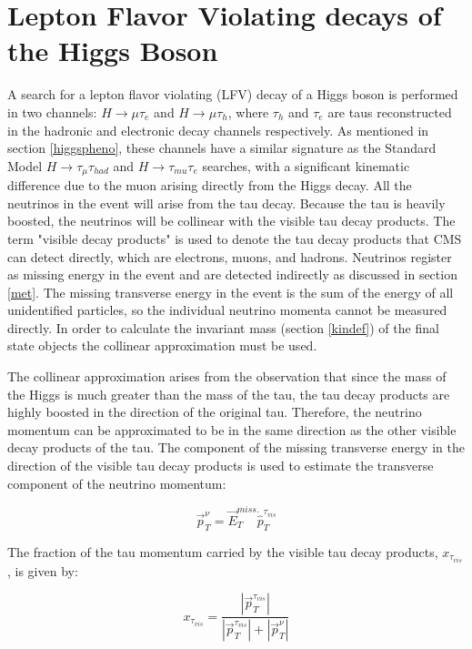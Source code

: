 \documentclass[oneside, letterpaper, oldfontcommands]{memoir}
\begin{document}
\chapter{Lepton Flavor Violating decays of the Higgs Boson}\label{lfv}
\qquad A search for a lepton flavor violating (LFV) decay of a Higgs boson is performed in two channels: $H \rightarrow \mu\tau_{e}$ and $H \rightarrow \mu\tau_{h}$, where $\tau_{h}$ and $\tau_{e}$ are taus reconstructed in the hadronic and electronic decay channels respectively. As mentioned in section \ref{higgspheno}, these channels have a similar signature as the Standard Model $H \rightarrow \tau_{\mu} \tau_{had}$ and $H \rightarrow \tau_{mu}\tau_{e}$ searches, with a significant kinematic difference due to the muon arising directly from the Higgs decay. All the neutrinos in the event will arise from the tau decay. Because the tau is heavily boosted, the neutrinos will be collinear with the visible tau decay products. The term "visible decay products" is used to denote the tau decay products that CMS can detect directly, which are electrons, muons, and hadrons. Neutrinos register as missing energy in the event and are detected indirectly as discussed in section \ref{met}. The missing transverse energy in the event is the sum of the energy of all unidentified particles, so the individual neutrino momenta cannot be measured directly. In order to calculate the invariant mass (section \ref{kindef}) of the final state objects the collinear approximation must be used.

\qquad The collinear approximation\cite{Ellis:1987xu} arises from the observation that since the mass of the Higgs is much greater than the mass of the tau, the tau decay products are highly boosted in the direction of the original tau. Therefore, the neutrino momentum can be approximated to be in the same direction as the other visible decay products of the tau. The component of the missing transverse energy in the direction of the visible tau decay products is used to estimate the transverse component of the neutrino momentum:

\begin{equation}
\vec{p}_{T}^{\nu} = \vec{E}_{T}^{miss} \dot \hat{p}_{T}^{\tau_{vis}}
\end{equation}

The fraction of the tau momentum carried by the visible tau decay products, $x_{\tau_{vis}}$, is given by:

\begin{equation}
x_{\tau_{vis}} = \frac{|\vec{p}_{T}^{\tau_{vis}}|}{|\vec{p}_{T}^{\tau_{vis}}| + |\vec{p}_{T}^{\nu}|}
\end{equation}
\end{document}
